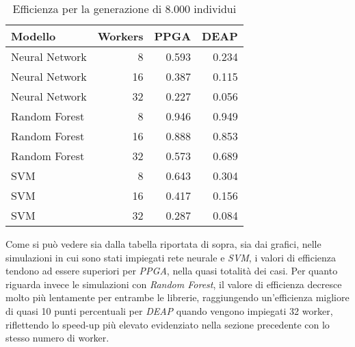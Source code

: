 \begin{table}[H]
	\centering
	\begin{tabular}{lrrr}
		\toprule
		Modello        & Workers & PPGA  & DEAP  \\
		\midrule
		Neural Network & 8       & 0.593 & 0.234 \\
		Neural Network & 16      & 0.387 & 0.115 \\
		Neural Network & 32      & 0.227 & 0.056 \\
		Random Forest  & 8       & 0.946 & 0.949 \\
		Random Forest  & 16      & 0.888 & 0.853 \\
		Random Forest  & 32      & 0.573 & 0.689 \\
		SVM            & 8       & 0.643 & 0.304 \\
		SVM            & 16      & 0.417 & 0.156 \\
		SVM            & 32      & 0.287 & 0.084 \\
		\bottomrule
	\end{tabular}
	\caption{Efficienza per la generazione di 8.000 individui}
	\label{tab: efficiency}
\end{table}

Come si può vedere sia dalla tabella riportata di sopra, sia dai grafici, nelle
simulazioni in cui sono stati impiegati rete neurale e \textit{SVM}, i valori
di efficienza tendono ad essere superiori per \textit{PPGA}, nella quasi
totalità dei casi. Per quanto riguarda invece le simulazioni con
\textit{Random Forest}, il valore di efficienza decresce molto più lentamente
per entrambe le librerie, raggiungendo un'efficienza migliore di quasi 10 punti
percentuali per \textit{DEAP} quando vengono impiegati 32 worker, riflettendo
lo speed-up più elevato evidenziato nella sezione precedente con lo stesso
numero di worker.
